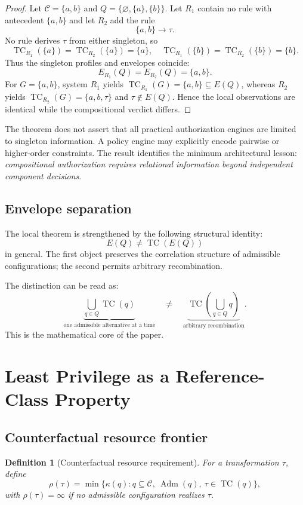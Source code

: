 \documentclass[11pt]{article}
\newtheorem{definition}[theorem]{Definition}
\newcommand{\TC}{\operatorname{TC}}
\newcommand{\Adm}{\operatorname{Adm}}
\newcommand{\rhoCF}{\rho}
\newcommand{\Cset}{\mathcal C}
\begin{document}
\begin{proof}
Let $\Cset=\{a,b\}$ and $Q=\{\varnothing,\{a\},\{b\}\}$. Let $R_1$ contain no rule with antecedent $\{a,b\}$ and let $R_2$ add the rule
\[
\{a,b\}\rightarrow\tau.
\]
No rule derives $\tau$ from either singleton, so
\[
\TC_{R_1}(\{a\})=\TC_{R_2}(\{a\})=\{a\},
\quad
\TC_{R_1}(\{b\})=\TC_{R_2}(\{b\})=\{b\}.
\]
Thus the singleton profiles and envelopes coincide:
\[
E_{R_1}(Q)=E_{R_2}(Q)=\{a,b\}.
\]
For $G=\{a,b\}$, system $R_1$ yields $\TC_{R_1}(G)=\{a,b\}\subseteq E(Q)$, whereas $R_2$ yields $\TC_{R_2}(G)=\{a,b,\tau\}$ and $\tau\notin E(Q)$. Hence the local observations are identical while the compositional verdict differs.
\end{proof}

The theorem does not assert that all practical authorization engines are limited to singleton information. A policy engine may explicitly encode pairwise or higher-order constraints. The result identifies the minimum architectural lesson: \emph{compositional authorization requires relational information beyond independent component decisions}.

\subsection{Envelope separation}

The local theorem is strengthened by the following structural identity:
\[
E(Q)\neq\TC(E(Q))
\]
in general. The first object preserves the correlation structure of admissible configurations; the second permits arbitrary recombination.

The distinction can be read as:
\[
\underbrace{\bigcup_{q\in Q}\TC(q)}_{\text{one admissible alternative at a time}}
\quad\neq\quad
\underbrace{\TC\left(\bigcup_{q\in Q}q\right)}_{\text{arbitrary recombination}}.
\]
This is the mathematical core of the paper.

\section{Least Privilege as a Reference-Class Property}

\subsection{Counterfactual resource frontier}

\begin{definition}[Counterfactual resource requirement]
For a transformation $\tau$, define
\[
\boxed{
\rhoCF(\tau)=
\min\{\kappa(q):q\subseteq\Cset,\ \Adm(q),\ \tau\in\TC(q)\},
}
\]
with $\rhoCF(\tau)=\infty$ if no admissible configuration realizes $\tau$.
\end{definition}
\end{document}
